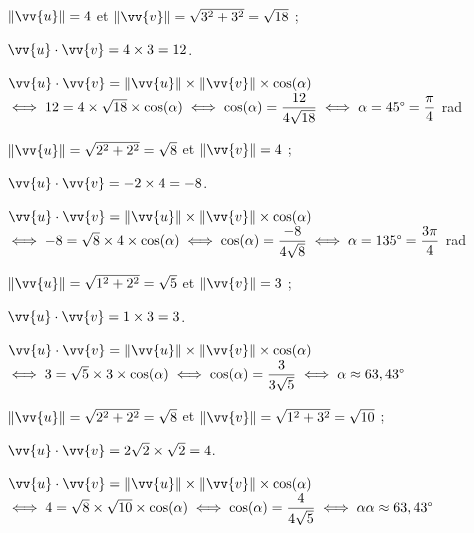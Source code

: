 \documentclass[11pt,a4paper]{article}  %
\begin{document}
\begin{corrBox}
	\begin{enumMet}
		\item \begin{enumMet}
				\item $\|\vv{u}\|=4$ et $\|\vv{v}\|=\sqrt{3^2+3^2}=\sqrt{18}$ ;
				\item $\vv{u} \cdot \vv{v}=4\times3=12$.
				\item $\vv{u} \cdot \vv{v}=\|\vv{u}\|\times\|\vv{v}\|\times \cos(\alpha)$\\
				$\iff 12=4\times\sqrt{18}\times\cos(\alpha)\iff \cos(\alpha)=\dfrac{12}{4\sqrt{18}}\iff \alpha=45\degree=\dfrac{\pi}{4}$ rad
		\end{enumMet}
	\item \begin{enumMet}
		\item $\|\vv{u}\|=\sqrt{2^2+2^2}=\sqrt{8}$ et $\|\vv{v}\|=4$ ;
		\item $\vv{u} \cdot \vv{v}=-2\times4=-8$.
		\item $\vv{u} \cdot \vv{v}=\|\vv{u}\|\times\|\vv{v}\|\times \cos(\alpha)$\\
		$\iff -8=\sqrt{8}\times4\times\cos(\alpha)\iff \cos(\alpha)=\dfrac{-8}{4\sqrt{8}}\iff \alpha=135\degree=\dfrac{3\pi}{4}$ rad
	\end{enumMet}
	\item \begin{enumMet}
		\item $\|\vv{u}\|=\sqrt{1^2+2^2}=\sqrt{5}$ et $\|\vv{v}\|=3$ ;
		\item $\vv{u} \cdot \vv{v}=1\times3=3$.
		\item $\vv{u} \cdot \vv{v}=\|\vv{u}\|\times\|\vv{v}\|\times \cos(\alpha)$\\
		$\iff 3=\sqrt{5}\times3\times\cos(\alpha)\iff \cos(\alpha)=\dfrac{3}{3\sqrt{5}}\iff \alpha\approx63,43\degree$
	\end{enumMet}
	\item \begin{enumMet}
		\item $\|\vv{u}\|=\sqrt{2^2+2^2}=\sqrt{8}$ et $\|\vv{v}\|=\sqrt{1^2+3^2}=\sqrt{10}$ ;
		\item $\vv{u} \cdot \vv{v}=2\sqrt{2}\times\sqrt{2}=4$.
		\item $\vv{u} \cdot \vv{v}=\|\vv{u}\|\times\|\vv{v}\|\times \cos(\alpha)$\\
		$\iff 4=\sqrt{8}\times\sqrt{10}\times\cos(\alpha)\iff \cos(\alpha)=\dfrac{4}{4\sqrt{5}}\iff \alpha\alpha\approx63,43\degree$
	\end{enumMet}
	\end{enumMet}
\end{corrBox}
\end{document}

